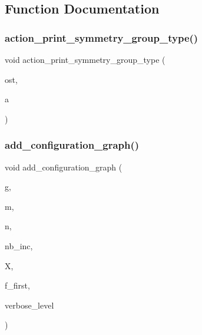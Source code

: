 \subsection{Function Documentation}
\mbox{\label{action__global_8_c_a03666b9440c4962148eba7905b9f843c}} 
\subsubsection{\texorpdfstring{action\+\_\+print\+\_\+symmetry\+\_\+group\+\_\+type()}{action\_print\_symmetry\_group\_type()}}
{\footnotesize\ttfamily void action\+\_\+print\+\_\+symmetry\+\_\+group\+\_\+type (\begin{DoxyParamCaption}\item[{ostream \&}]{ost,  }\item[{\mbox{\hyperlink{action_8h_a609fcdec33cc2d16c6c067d07931cba9}{symmetry\+\_\+group\+\_\+type}}}]{a }\end{DoxyParamCaption})}

\mbox{\label{action__global_8_c_a7cf2d387d2f1c8d3fb761317f55aeca6}} 
\subsubsection{\texorpdfstring{add\+\_\+configuration\+\_\+graph()}{add\_configuration\_graph()}}
{\footnotesize\ttfamily void add\+\_\+configuration\+\_\+graph (\begin{DoxyParamCaption}\item[{ofstream \&}]{g,  }\item[{\mbox{\hyperlink{galois_8h_a09fddde158a3a20bd2dcadb609de11dc}{I\+NT}}}]{m,  }\item[{\mbox{\hyperlink{galois_8h_a09fddde158a3a20bd2dcadb609de11dc}{I\+NT}}}]{n,  }\item[{\mbox{\hyperlink{galois_8h_a09fddde158a3a20bd2dcadb609de11dc}{I\+NT}}}]{nb\+\_\+inc,  }\item[{\mbox{\hyperlink{galois_8h_a09fddde158a3a20bd2dcadb609de11dc}{I\+NT}} $\ast$}]{X,  }\item[{\mbox{\hyperlink{galois_8h_a09fddde158a3a20bd2dcadb609de11dc}{I\+NT}}}]{f\+\_\+first,  }\item[{\mbox{\hyperlink{galois_8h_a09fddde158a3a20bd2dcadb609de11dc}{I\+NT}}}]{verbose\+\_\+level }\end{DoxyParamCaption})}

